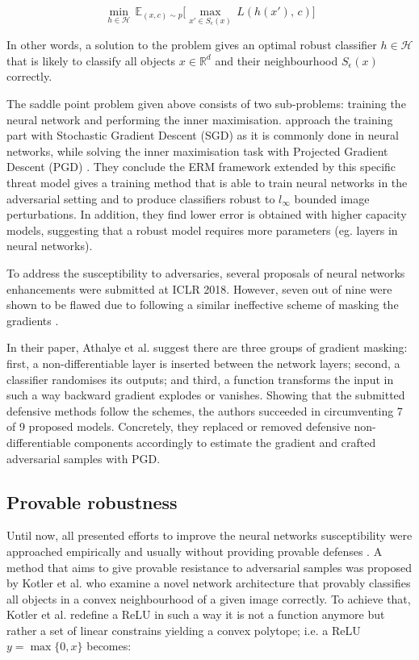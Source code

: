 \begin{equation}
\min_{h \in \mathcal{H}} \, \mathbb{E}_{(x, c) \sim p} \Big[ \max_{x' \in S_\epsilon (x)} \,  L(h(x'), \, c) \Big]
\end{equation}

In other words, a solution to the problem gives an optimal robust
classifier $h \in \mathcal{H}$ that is likely to classify all objects
$x \in \mathbb{R}^d$ and their neighbourhood $S_\epsilon (x)$
correctly.

The saddle point problem given above consists of two sub-problems:
training the neural network and performing the inner maximisation.
\cite{towards_deep_learning_models} approach the training part with Stochastic Gradient
Descent (SGD) as it is commonly done in neural networks, while solving
the inner maximisation task with Projected Gradient Descent (PGD)
\cite{pgd}. They conclude the ERM framework extended by this
specific threat model gives a training method that is able to train
neural networks in the adversarial setting and to produce classifiers
robust to $l_\infty$ bounded image perturbations. In addition, they
find lower error is obtained with higher capacity models, suggesting
that a robust model requires more parameters (eg. layers in neural
networks).

To address the susceptibility to adversaries, several proposals of
neural networks enhancements were submitted at ICLR 2018. However, seven
out of nine were shown to be flawed due to following a similar
ineffective scheme of masking the gradients \cite{obfuscated_gradients}.

In their paper, Athalye et al. \cite{obfuscated_gradients} suggest there are three groups of
gradient masking: first, a non-differentiable layer is inserted between
the network layers; second, a classifier randomises its outputs; and
third, a function transforms the input in such a way backward gradient
explodes or vanishes. Showing that the submitted defensive methods
follow the schemes, the authors succeeded in circumventing 7 of 9
proposed models. Concretely, they replaced or removed defensive
non-differentiable components accordingly to estimate the gradient and
crafted adversarial samples with PGD.

\subsection{Provable robustness}

Until now, all presented efforts to improve the neural networks
susceptibility were approached empirically and usually without providing
provable defenses \cite{towards_deep_learning_models}. A method that aims to give provable
resistance to adversarial samples was proposed by Kotler et al. \cite{provable_defenses} who
examine a novel network architecture that provably classifies all
objects in a convex neighbourhood of a given image correctly. To achieve
that, Kotler et al. \cite{provable_defenses} redefine a ReLU \cite{relu} in such a way it
is not a function anymore but rather a set of linear constrains yielding
a convex polytope; i.e. a ReLU $y = \max \{0, x\}$ becomes:

